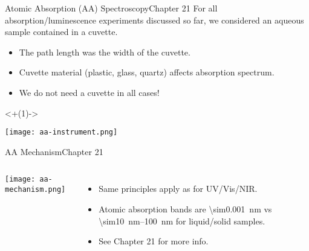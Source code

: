 \documentclass[notes=only]{beamer}
\begin{document}

\begin{frame}{Atomic Absorption (AA) Spectroscopy}{Chapter 21}
	For all absorption/luminescence experiments discussed so far, we
	considered an aqueous sample contained in a cuvette.
	\begin{itemize}[<+(1)->]
			\item The path length was the width of the
				cuvette.
			\item Cuvette material (plastic, glass, quartz)
				affects absorption spectrum.
			\item We \alert{do not need} a cuvette in all
				cases!
	\end{itemize}
	\onslide<+(1)->
	\begin{center}
		\texttt{[image: aa-instrument.png]}
	\end{center}
\end{frame}

\begin{frame}{AA Mechanism}{Chapter 21}
	\begin{columns}
		\begin{center}
			\texttt{[image: aa-mechanism.png]}
		\end{center}
		\begin{itemize}
			\item Same principles apply as for UV/Vis/NIR.
			\item Atomic absorption bands are
				\SI{\sim0.001}{\nano\meter} vs
				\SIrange{\sim10}{100}{\nano\meter} for
				liquid/solid samples.
			\item See Chapter 21 for more info.
		\end{itemize}
	\end{columns}
\end{frame}

\end{document}
